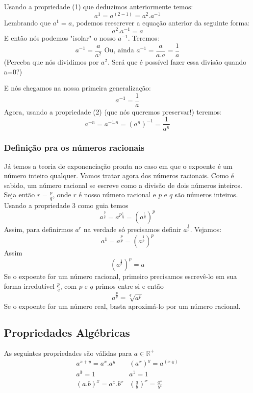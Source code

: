 Usando a propriedade (1) que deduzimos anteriormente temos:
$$a^1 = a^{(2-1)} = a^2.a^{-1}$$
Lembrando que $a^1 = a$, podemos reescrever a equação anterior da seguinte forma:
$$a^2.a^{-1} = a$$E então nós podemos "isolar" o nosso $a^{-1}$. Teremos:
$$a^{-1} = \frac{a}{a^2} \text{ Ou, ainda } a^{-1} = \frac{a}{a.a} = \frac{1}{a}$$
(Perceba que nós dividimos por $a^2$. Será que é possível fazer essa divisão quando a=0?)

E nós chegamos na nossa primeira generalização: $$a^{-1} = \frac{1}{a}$$
Agora, usando a propriedade (2) (que nós queremos preservar!) teremos: $$a^{-n} = a^{-1.n}=(a^n)^{-1}=\frac{1}{a^n}$$

\subsubsection{Definição pra os números racionais}
Já temos a teoria de exponenciação pronta no caso em que o expoente é um número inteiro qualquer. Vamos tratar agora dos números racionais. Como é sabido, um número racional se escreve como a divisão de dois números inteiros. Seja então $r = \frac{p}{q}$, onde $r$ é nosso número racional e $p$ e $q$ são números inteiros. Usando a propriedade $3$ como guia temos
$$a^{\frac{p}{q}} = a^{p \frac{1}{q}} = (a^{\frac{1}{q}})^p$$Assim, para definirmos $a^r$ na verdade só precisamos definir $a^{\frac{1}{p}}$. Vejamos: $$a^1 = a^{\frac{p}{p}} = (a^{\frac{1}{p}})^p$$Assim $$(a^{\frac{1}{p}})^p = a$$
Se o expoente for um número racional, primeiro precisamos escrevê-lo em sua forma irredutível $\frac{p}{q}$, com $p$ e $q$ primos entre si e então
$$a^{\frac{p}{q}} = \sqrt[q]{a^p}$$
Se o expoente for um número real, basta aproximá-lo por um número racional. 
\subsection{Propriedades Algébricas}
As seguintes propriedades são válidas para $a \in \mathbb{R}^+$
\begin{eqnarray}
a^{x+y}=a^x.a^y & (a^x)^y = a^{(x.y)} \\
a^0 = 1 & a^1 = 1 \\
(a.b)^x = a^x.b^x  & \left ( \frac{a}{b} \right )^x = \frac{a^x}{b^x} 
\end{eqnarray}

